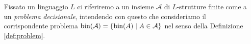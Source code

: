 \begin{definizione}
\label{def:problem-struct}
Fissato un linguaggio $L$ ci riferiremo a un insieme $\mathcal{A}$ di $L$-strutture finite
come a un \emph{problema decisionale}, intendendo con questo che consideriamo il corrispondente
problema $\operatorname{bin}(\mathcal{A}) = \{\operatorname{bin}(A) \mid A \in \mathcal{A}\}$ nel senso della Definizione \ref{def:problem}.
\end{definizione}
